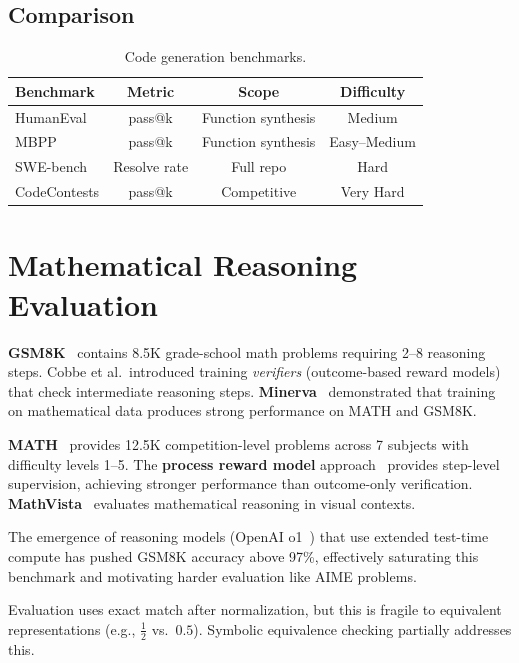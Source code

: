 \documentclass[11pt]{article}
\begin{document}
\subsection{Comparison}

\begin{table}[h]
\centering
\caption{Code generation benchmarks.}
\small
\begin{tabular}{@{}lccc@{}}
\toprule
\textbf{Benchmark} & \textbf{Metric} & \textbf{Scope} & \textbf{Difficulty} \\
\midrule
HumanEval & pass@k & Function synthesis & Medium \\
MBPP & pass@k & Function synthesis & Easy--Medium \\
SWE-bench & Resolve rate & Full repo & Hard \\
CodeContests & pass@k & Competitive & Very Hard \\
\bottomrule
\end{tabular}
\end{table}

\section{Mathematical Reasoning Evaluation}
\label{sec:math}

\textbf{GSM8K}~\cite{cobbe2021gsm8k} contains 8.5K grade-school math problems requiring 2--8 reasoning steps. Cobbe et al.\ introduced training \emph{verifiers} (outcome-based reward models) that check intermediate reasoning steps. \textbf{Minerva}~\cite{lewkowycz2022minerva} demonstrated that training on mathematical data produces strong performance on MATH and GSM8K.

\textbf{MATH}~\cite{hendrycks2021math} provides 12.5K competition-level problems across 7 subjects with difficulty levels 1--5. The \textbf{process reward model} approach~\cite{lightman2023lets} provides step-level supervision, achieving stronger performance than outcome-only verification. \textbf{MathVista}~\cite{lu2024mathvista} evaluates mathematical reasoning in visual contexts.

The emergence of reasoning models (OpenAI o1~\cite{openai2024o1}) that use extended test-time compute has pushed GSM8K accuracy above 97\%, effectively saturating this benchmark and motivating harder evaluation like AIME problems.

Evaluation uses exact match after normalization, but this is fragile to equivalent representations (e.g., $\frac{1}{2}$ vs.\ $0.5$). Symbolic equivalence checking partially addresses this.
\end{document}
